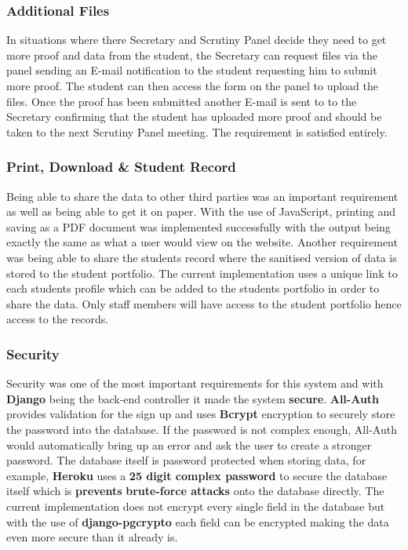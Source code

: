\documentclass[../main.tex]{subfiles}
\begin{document}
\subsubsection{Additional Files}
In situations where there Secretary and Scrutiny Panel decide they need to get more proof and data from the student, the Secretary can request files via the panel sending an E-mail notification to the student requesting him to submit more proof. The student can then access the form on the panel to upload the files. Once the proof has been submitted another E-mail is sent to to the Secretary confirming that the student has uploaded more proof and should be taken to the next Scrutiny Panel meeting. The requirement is satisfied entirely. 
\subsubsection{Print, Download \& Student Record}
Being able to share the data to other third parties was an important requirement as well as being able to get it on paper. With the use of JavaScript, printing and saving as a PDF document was implemented successfully with the output being exactly the same as what a user would view on the website. Another requirement was being able to share the students record where the sanitised version of data is stored to the student portfolio. The current implementation uses a unique link to each students profile which can be added to the students portfolio in order to share the data. Only staff members will have access to the student portfolio hence access to the records.
\subsubsection{Security}   
Security was one of the most important requirements for this system and with \textbf{Django} being the back-end controller it made the system \textbf{secure}. \textbf{All-Auth}\cite{allauth} provides validation for the sign up and uses \textbf{Bcrypt}\cite{bcrypt} encryption to securely store the password into the database. If the password is not complex enough, All-Auth would automatically bring up an error and ask the user to create a stronger password. The database itself is password protected when storing data, for example, \textbf{Heroku} uses a \textbf{25 digit complex password} to secure the database itself which is \textbf{prevents} \textbf{brute-force attacks} onto the database directly. The current implementation does not encrypt every single field in the database but with the use of \textbf{django-pgcrypto}\cite{dbencrypt} each field can be encrypted making the data even more secure than it already is. \\[4mm]
\end{document}
